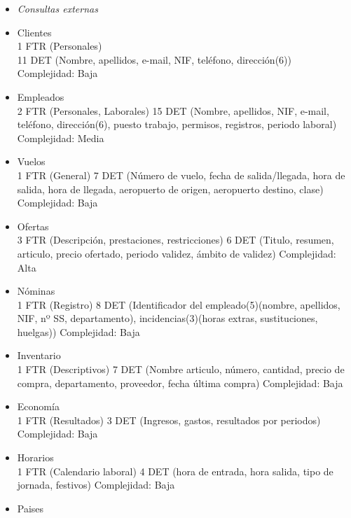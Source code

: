 \begin{enumerate}
	\begin{itemize}
	\item \textsl{Consultas externas}
		\item Clientes \\
			1 FTR (Personales) \\
			11 DET (Nombre, apellidos, e-mail, NIF, teléfono, dirección(6)) \\
			Complejidad: Baja\\
		\item Empleados \\
			2 FTR (Personales, Laborales)
			15 DET (Nombre, apellidos, NIF, e-mail, teléfono, dirección(6), puesto trabajo, permisos, registros, periodo laboral)
			Complejidad: Media\\
		\item Vuelos\\
			1 FTR (General)
			7 DET (Número de vuelo, fecha de salida/llegada, hora de salida, hora de llegada, aeropuerto de origen, aeropuerto destino,
			clase)
			Complejidad: Baja\\
		\item Ofertas\\
			3 FTR (Descripción, prestaciones, restricciones)
			6 DET (Titulo, resumen, articulo, precio ofertado, periodo validez, ámbito de validez)
			Complejidad: Alta\\
		\item Nóminas\\
			1 FTR (Registro)
			8 DET (Identificador del empleado(5)(nombre, apellidos, NIF, nº SS, departamento), incidencias(3)(horas extras,
			sustituciones, huelgas))
			Complejidad: Baja\\
		\item Inventario\\
			1 FTR (Descriptivos)
			7 DET (Nombre articulo, número, cantidad, precio de compra, departamento, proveedor, fecha última compra)
			Complejidad: Baja\\
		\item Economía\\
			1 FTR (Resultados)
			3 DET (Ingresos, gastos, resultados por periodos)
			Complejidad: Baja\\
		\item Horarios\\
			1 FTR (Calendario laboral)
			4 DET (hora de entrada, hora salida, tipo de jornada, festivos)
			Complejidad: Baja\\
		\item Paises \\

\end{itemize}
\end{enumerate}
